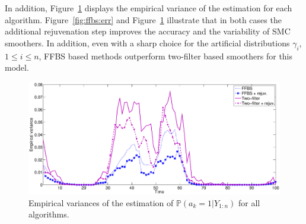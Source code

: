 \documentclass[nolayout]{article}
\theoremstyle{plain}
\theoremstyle{definition}
\newcommand{\1}{\mathbbm{1}}
\def\barH{\overline{H}}
\def\eqsp{\,}
\begin{document}
In addition, Figure~\ref{fig:ffbs:var} displays the empirical variance of the estimation for each algorithm.
Figure~\ref{fig:ffbs:err} and  Figure~\ref{fig:ffbs:var} illustrate that in both cases the additional rejuvenation step improves the accuracy and the variability of SMC smoothers. In addition, even with a sharp choice for the artificial distributions $\gamma_i$, $1\le i\le n$,  FFBS based methods outperform two-filter based smoothers for this model. 
\begin{figure}
\centering
\includegraphics[scale=.3]{var2}
\caption{Empirical variances of the estimation of $\mathbb{P}(a_k=1|Y_{1:n})$ for all algorithms.}
\label{fig:ffbs:var}
\end{figure}
\end{document}
